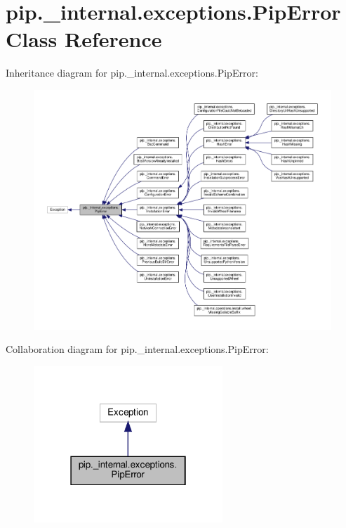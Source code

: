 \hypertarget{classpip_1_1__internal_1_1exceptions_1_1PipError}{}\section{pip.\+\_\+internal.\+exceptions.\+Pip\+Error Class Reference}
\label{classpip_1_1__internal_1_1exceptions_1_1PipError}


Inheritance diagram for pip.\+\_\+internal.\+exceptions.\+Pip\+Error\+:
\nopagebreak
\begin{figure}[H]
\begin{center}
\leavevmode
\includegraphics[width=350pt]{classpip_1_1__internal_1_1exceptions_1_1PipError__inherit__graph}
\end{center}
\end{figure}


Collaboration diagram for pip.\+\_\+internal.\+exceptions.\+Pip\+Error\+:
\nopagebreak
\begin{figure}[H]
\begin{center}
\leavevmode
\includegraphics[width=202pt]{classpip_1_1__internal_1_1exceptions_1_1PipError__coll__graph}
\end{center}
\end{figure}



